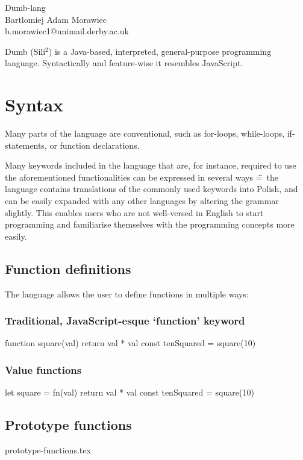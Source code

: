 \documentclass[12pt,a4paper]{article}
\begin{document}
\begin{center}
  \Huge {Dumb-lang}\\[0.25cm]
  \small {Bartlomiej Adam Morawiec\\
  b.morawiec1@unimail.derby.ac.uk}\par
\end{center}

Dumb (Sili$^2$) is a Java-based, interpreted, general-purpose programming language. Syntactically and feature-wise it resembles JavaScript.\par

\section{Syntax}
Many parts of the language are conventional, such as for-loops, while-loops, if-statements, or function declarations.\par

Many keywords included in the language that are, for instance, required to use the aforementioned functionalities can be expressed in several ways \==~the language contains translations of the commonly used keywords into Polish, and can be easily expanded with any other languages by altering the grammar slightly. This enables users who are not well-versed in English to start programming and familiarise themselves with the programming concepts more easily.

\subsection{Function definitions}
The language allows the user to define functions in multiple ways:

\subsubsection{Traditional, JavaScript-esque `function' keyword}
function square(val) {
  return val * val
}
const tenSquared = square(10)

\subsubsection{Value functions}
let square = fn(val) {
  return val * val
}
const tenSquared = square(10)

\subsection{Prototype functions}
{prototype-functions.tex}
\end{document}
